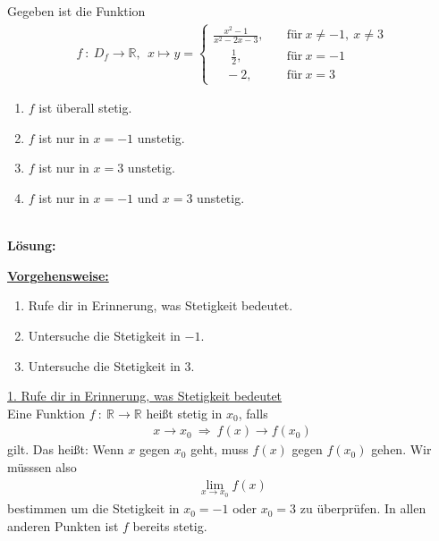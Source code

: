 \subsection*{}
Gegeben ist die Funktion 
\begin{align*}
f \ : \ D_f \to \mathbb{R}, \ \
x \mapsto y=
\begin{cases}
\frac{x^2-1}{x^2 - 2x -3} , &\quad \text{für} \ x\neq -1, \ x \neq 3 \\
\quad \ \ \frac{1}{2}, &\quad \text{für} \ x = -1 \\
\quad -2, &\quad \text{für} \ x = 3
\end{cases}
\end{align*}
\renewcommand{\labelenumi}{(\alph{enumi})}
\begin{enumerate}
\item $f$ ist überall stetig.
\item $f$ ist nur in $x = -1 $ unstetig.
\item $f$ ist nur in $x = 3 $ unstetig.
\item $f$ ist nur in $x = -1 $ und $x = 3 $ unstetig.
\end{enumerate}
\ \\
\textbf{Lösung:}
\begin{mdframed}
\underline{\textbf{Vorgehensweise:}}
\renewcommand{\labelenumi}{\theenumi.}
\begin{enumerate}
\item Rufe dir in Erinnerung, was Stetigkeit bedeutet.
\item Untersuche die Stetigkeit in $-1$.
\item Untersuche die Stetigkeit in $3$.
\end{enumerate}
\end{mdframed}
\underline{1. Rufe dir in Erinnerung, was Stetigkeit bedeutet}\\
Eine Funktion $f \ : \ \mathbb{R} \to \mathbb{R}$ heißt stetig in $x_0$,
falls 
\begin{align*}
x \rightarrow x_0 \ \Rightarrow \ f(x) \rightarrow f(x_0)
\end{align*}
gilt.
Das heißt: Wenn $x$ gegen $x_0$ geht, muss $f(x)$ gegen $f(x_0)$ gehen.
Wir müsssen also
\begin{align*}
\lim \limits_{x \rightarrow x_0} f(x)
\end{align*}
bestimmen um die Stetigkeit in $x_0 = -1$ oder $x_0=3$ zu überprüfen.
In allen anderen Punkten ist $f$ bereits stetig.\\
\\

